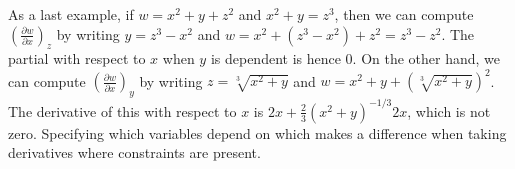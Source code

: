 As a last example, if $w=x^2+y+z^2$ and $x^2+y=z^3$, then we can
compute $\displaystyle\left(\frac{\partial w}{\partial x}\right)_{z}$ by writing
$y=z^3-x^2$ and $w=x^2+(z^3-x^2)+z^2 = z^3-z^2$.  The partial with
respect to $x$ when $y$ is dependent is hence 0.  On the other hand,
we can compute $\displaystyle\left(\frac{\partial w}{\partial x}\right)_{y}$ by
writing $z=\sqrt[3]{x^2+y}$ and $w=x^2+y+(\sqrt[3]{x^2+y})^2$. The
derivative of this with respect to $x$ is
$2x+\frac{2}{3}(x^2+y)^{-1/3}2x $, which is not zero. Specifying which
variables depend on which makes a difference when taking derivatives
where constraints are present.









